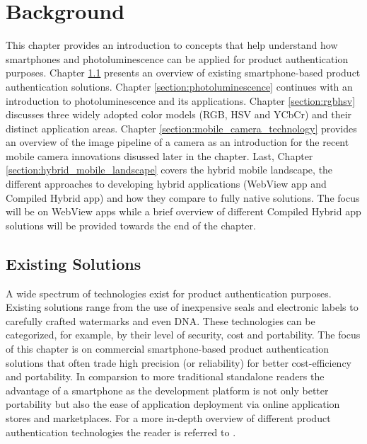\documentclass[thesis.tex]{subfiles}
\begin{document}
\chapter{Background}
\label{chapter:background}

This chapter provides an introduction to concepts that help understand how smartphones and photoluminescence can be applied for product authentication purposes. Chapter \ref{section:existing_solutions} presents an overview of existing smartphone-based product authentication solutions. Chapter \ref{section:photoluminescence} continues with an introduction to photoluminescence and its applications. Chapter \ref{section:rgbhsv} discusses three widely adopted color models (RGB, HSV and YCbCr) and their distinct application areas. Chapter \ref{section:mobile_camera_technology} provides an overview of the image pipeline of a camera as an introduction for the recent mobile camera innovations disussed later in the chapter. Last, Chapter \ref{section:hybrid_mobile_landscape} covers the hybrid mobile landscape, the different approaches to developing hybrid applications (WebView app and Compiled Hybrid app) and how they compare to fully native solutions. The focus will be on WebView apps while a brief overview of different Compiled Hybrid app solutions will be provided towards the end of the chapter.


\section{Existing Solutions}
\label{section:existing_solutions}

A wide spectrum of technologies exist for product authentication purposes. Existing solutions range from the use of inexpensive seals and electronic labels to carefully crafted watermarks and even DNA. These technologies can be categorized, for example, by their level of security, cost and portability. The focus of this chapter is on commercial smartphone-based product authentication solutions that often trade high precision (or reliability) for better cost-efficiency and portability. In comparsion to more traditional standalone readers the advantage of a smartphone as the development platform is not only better portability but also the ease of application deployment via online application stores and marketplaces. For a more in-depth overview of different product authentication technologies the reader is referred to \cite{kuosmanen}.
\end{document}
